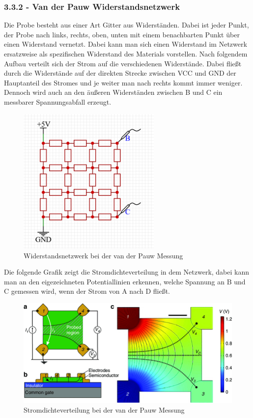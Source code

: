 \documentclass[a4paper]{scrartcl}
\numberwithin{equation}{subsection}
\begin{document}
\subsubsection{3.3.2 - Van der Pauw Widerstandsnetzwerk}
Die Probe besteht aus einer Art Gitter aus Widerständen. Dabei ist jeder Punkt, der Probe nach links, rechts, oben, unten mit einem benachbarten Punkt über einen Widerstand vernetzt. Dabei kann man sich einen Widerstand im Netzwerk ersatzweise als spezifischen Widerstand des Materials vorstellen. Nach folgendem Aufbau verteilt sich der Strom auf die verschiedenen Widerstände. Dabei fließt durch die Widerstände auf der direkten Strecke zwischen VCC und GND der Hauptanteil des Stromes und je weiter man nach rechts kommt immer weniger. Dennoch wird auch an den äußeren Widerständen zwischen B und C ein messbarer Spannungsabfall erzeugt.

\begin{figure}[H]
\includegraphics[width=7cm]{Widerstandsnetzwerk_v3}
\centering
\caption{Widerstandsnetzwerk bei der van der Pauw Messung}
\centering
\label{fig:widerstandsnetzwerk}
\end{figure}

Die folgende Grafik zeigt die Stromdichteverteilung in dem Netzwerk, dabei kann man an den eigezeichneten Potentiallinien erkennen, welche Spannung an B und C gemessen wird, wenn der Strom von A nach D fließt.

\begin{figure}[H]
\includegraphics[width=12cm]{Top-view-of-van-der-Pauw-square-shaped}
\centering
\caption{Stromdichteverteilung bei der van der Pauw Messung \protect\footnotemark}
\centering
\label{fig:top-view-of-van-der-pauw}
\end{figure}
\end{document}
